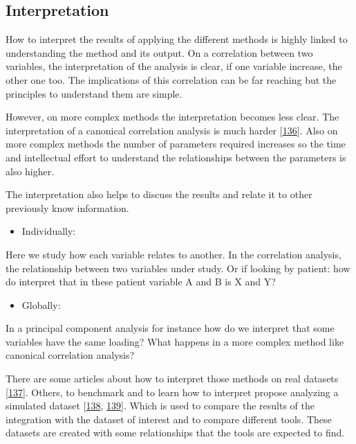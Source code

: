 \documentclass[
  a4paper,
]{book}
\providecommand{\tightlist}{%
  \setlength{\itemsep}{0pt}\setlength{\parskip}{0pt}}
\begin{document}
\hypertarget{interpretation}{%
\subsection{Interpretation}\label{interpretation}}

How to interpret the results of applying the different methods is highly linked to understanding the method and its output.
On a correlation between two variables, the interpretation of the analysis is clear, if one variable increase, the other one too.
The implications of this correlation can be far reaching but the principles to understand them are simple.

However, on more complex methods the interpretation becomes less clear.
The interpretation of a canonical correlation analysis is much harder {[}\protect\hyperlink{ref-sherry2005}{136}{]}.
Also on more complex methods the number of parameters required increases so the time and intellectual effort to understand the relationships between the parameters is also higher.

The interpretation also helps to discuss the results and relate it to other previously know information.

\begin{itemize}
\tightlist
\item
  Individually:
\end{itemize}

Here we study how each variable relates to another.
In the correlation analysis, the relationship between two variables under study.
Or if looking by patient: how do interpret that in these patient variable A and B is X and Y?

\begin{itemize}
\tightlist
\item
  Globally:
\end{itemize}

In a principal component analysis for instance how do we interpret that some variables have the same loading?
What happens in a more complex method like canonical correlation analysis?

There are some articles about how to interpret those methods on real datasets {[}\protect\hyperlink{ref-sherryConductingInterpretingCanonical1981}{137}{]}.
Others, to benchmark and to learn how to interpret propose analyzing a simulated dataset {[}\protect\hyperlink{ref-chung_multi-omics_2019}{138}, \protect\hyperlink{ref-martinez-mira_mosim_2018}{139}{]}.
Which is used to compare the results of the integration with the dataset of interest and to compare different tools.
These datasets are created with some relationships that the tools are expected to find.
\end{document}
